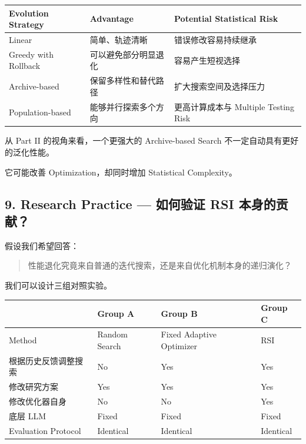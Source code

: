 \begin{readertable}
\begin{longtable}[]{@{}
  >{\raggedright\arraybackslash}p{}
  >{\raggedright\arraybackslash}p{}
  >{\raggedright\arraybackslash}p{}@{}}
\toprule
Evolution Strategy & Advantage & Potential Statistical Risk \\
\midrule
\endhead
Linear & 简单、轨迹清晰 & 错误修改容易持续继承 \\
Greedy with Rollback & 可以避免部分明显退化 & 容易产生短视选择 \\
Archive-based & 保留多样性和替代路径 & 扩大搜索空间及选择压力 \\
Population-based & 能够并行探索多个方向 & 更高计算成本与 Multiple Testing Risk \\
\bottomrule
\end{longtable}
\end{readertable}

从 Part II 的视角来看，一个更强大的 Archive-based Search 不一定自动具有更好的泛化性能。

它可能改善 Optimization，却同时增加 Statistical Complexity。

\hypertarget{part-3-37-0001-research-practice-ux5982ux4f55ux9a8cux8bc1-rsi-ux672cux8eabux7684ux8d21ux732e}{%
\subsection{9. Research Practice --- 如何验证 RSI 本身的贡献？}\label{part-3-37-0001-research-practice-ux5982ux4f55ux9a8cux8bc1-rsi-ux672cux8eabux7684ux8d21ux732e}}

假设我们希望回答：

\begin{quote}
性能退化究竟来自普通的迭代搜索，还是来自优化机制本身的递归演化？
\end{quote}

我们可以设计三组对照实验。

\begin{readertable}
\begin{longtable}[]{@{}
  >{\raggedright\arraybackslash}p{}
  >{\raggedright\arraybackslash}p{}
  >{\raggedright\arraybackslash}p{}
  >{\raggedright\arraybackslash}p{}@{}}
\toprule
& Group A & Group B & Group C \\
\midrule
\endhead
Method & Random Search & Fixed Adaptive Optimizer & RSI \\
根据历史反馈调整搜索 & No & Yes & Yes \\
修改研究方案 & Yes & Yes & Yes \\
修改优化器自身 & No & No & Yes \\
底层 LLM & Fixed & Fixed & Fixed \\
Evaluation Protocol & Identical & Identical & Identical \\
\bottomrule
\end{longtable}
\end{readertable}

